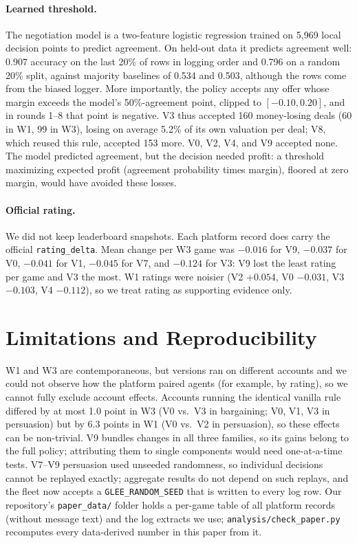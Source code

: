 \documentclass{article}
\begin{document}
\paragraph{Learned threshold.}
The negotiation model is a two-feature logistic regression trained on 5{,}969 local decision points to predict agreement. On held-out data it predicts agreement well: 0.907 accuracy on the last 20\% of rows in logging order and 0.796 on a random 20\% split, against majority baselines of 0.534 and 0.503, although the rows come from the biased logger. More importantly, the policy accepts any offer whose margin exceeds the model's 50\%-agreement point, clipped to $[-0.10, 0.20]$, and in rounds 1--8 that point is negative. V3 thus accepted 160 money-losing deals (60 in W1, 99 in W3), losing on average 5.2\% of its own valuation per deal; V8, which reused this rule, accepted 153 more. V0, V2, V4, and V9 accepted none. The model predicted agreement, but the decision needed profit: a threshold maximizing expected profit (agreement probability times margin), floored at zero margin, would have avoided these losses.

\paragraph{Official rating.}
We did not keep leaderboard snapshots. Each platform record does carry the official \texttt{rating\_delta}. Mean change per W3 game was $-0.016$ for V9, $-0.037$ for V0, $-0.041$ for V1, $-0.045$ for V7, and $-0.124$ for V3: V9 lost the least rating per game and V3 the most. W1 ratings were noisier (V2 $+0.054$, V0 $-0.031$, V3 $-0.103$, V4 $-0.112$), so we treat rating as supporting evidence only.

\section{Limitations and Reproducibility}

W1 and W3 are contemporaneous, but versions ran on different accounts and we could not observe how the platform paired agents (for example, by rating), so we cannot fully exclude account effects. Accounts running the identical vanilla rule differed by at most 1.0 point in W3 (V0 vs.\ V3 in bargaining; V0, V1, V3 in persuasion) but by 6.3 points in W1 (V0 vs.\ V2 in persuasion), so these effects can be non-trivial. V9 bundles changes in all three families, so its gains belong to the full policy; attributing them to single components would need one-at-a-time tests. V7--V9 persuasion used unseeded randomness, so individual decisions cannot be replayed exactly; aggregate results do not depend on such replays, and the fleet now accepts a \texttt{GLEE\_RANDOM\_SEED} that is written to every log row. Our repository's \texttt{paper\_data/} folder holds a per-game table of all platform records (without message text) and the log extracts we use; \texttt{analysis/check\_paper.py} recomputes every data-derived number in this paper from it.
\end{document}
